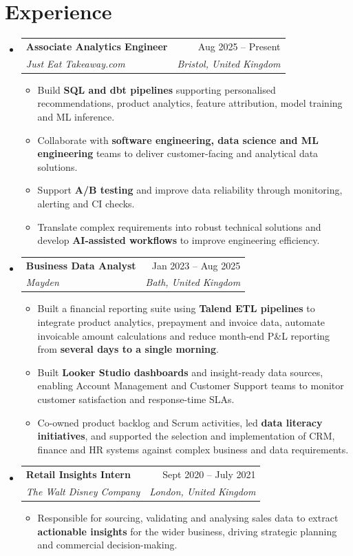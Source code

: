 \documentclass[a4paper,10pt]{article}
\makeatletter
\newcommand{\resumeItem}[1]{
  \item\small{#1}
}
\newcommand{\resumeItemListStart}{\begin{itemize}[rightmargin=0.11in, itemsep=2pt]}
\newcommand{\resumeItemListEnd}{\end{itemize}}
\newcommand{\resumeQuadHeading}[4]{
  \item
  \begin{tabular*}{0.96\textwidth}[t]{l@{\extracolsep{\fill}}r}
    \textbf{#1} & #2 \\
    \textit{\small#3} & \textit{\small #4} \\
  \end{tabular*}
}
\newcommand{\resumeHeadingListStart}{
  \begin{itemize}[leftmargin=0.15in, label={}, itemsep=2pt]
}
\newcommand{\resumeHeadingListEnd}{\end{itemize}}
\makeatother
\begin{document}

\section{Experience}
\resumeHeadingListStart{}
  \resumeQuadHeading{Associate Analytics Engineer}{Aug 2025 -- Present}
  {Just Eat Takeaway.com}{Bristol, United Kingdom}
    \resumeItemListStart{}
      \resumeItem{Build \textbf{SQL and dbt pipelines} supporting personalised recommendations, product analytics, feature attribution, model training and ML inference.}
      \resumeItem{Collaborate with \textbf{software engineering, data science and ML engineering} teams to deliver customer-facing and analytical data solutions.}
      \resumeItem{Support \textbf{A/B testing} and improve data reliability through monitoring, alerting and CI checks.}
      \resumeItem{Translate complex requirements into robust technical solutions and develop \textbf{AI-assisted workflows} to improve engineering efficiency.}
    \resumeItemListEnd{}


  \resumeQuadHeading{Business Data Analyst}{Jan 2023 -- Aug 2025}
  {Mayden}{Bath, United Kingdom}
    \resumeItemListStart{}
      \resumeItem{Built a financial reporting suite using \textbf{Talend ETL pipelines} to integrate product analytics, prepayment and invoice data, automate invoicable amount calculations and reduce month-end P\&L reporting from \textbf{several days to a single morning}.}
      \resumeItem{Built \textbf{Looker Studio dashboards} and insight-ready data sources, enabling Account Management and Customer Support teams to monitor customer satisfaction and response-time SLAs.}
      \resumeItem{Co-owned product backlog and Scrum activities, led \textbf{data literacy initiatives}, and supported the selection and implementation of CRM, finance and HR systems against complex business and data requirements.}
    \resumeItemListEnd{}


  \resumeQuadHeading{Retail Insights Intern}{Sept 2020 -- July 2021}
    {The Walt Disney Company}{London, United Kingdom}
    \resumeItemListStart{}
      \resumeItem{Responsible for sourcing, validating and analysing sales data to extract \textbf{actionable insights} for the wider business, driving strategic planning and commercial decision-making.}
    \resumeItemListEnd{}
\resumeHeadingListEnd{}
\end{document}
